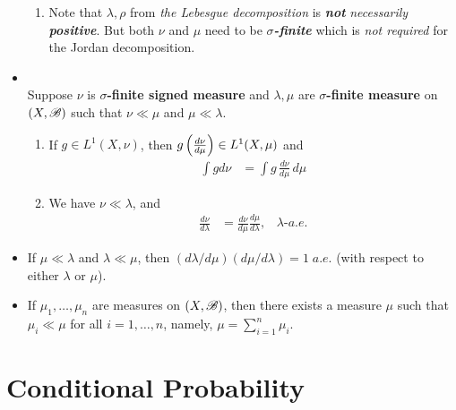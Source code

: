 \documentclass[11pt]{article}
\begin{document}
\begin{itemize}
\begin{remark}
\begin{enumerate}
\item Note that $\lambda, \rho$ from \emph{the Lebesgue decomposition} is \emph{\textbf{not}} \emph{necessarily} \emph{\textbf{positive}}. But both $\nu$ and $\mu$ need to be \emph{\textbf{$\sigma$-finite}} which is \emph{not required} for the Jordan decomposition.
\end{enumerate}
\end{remark} 

\item \begin{proposition}\citep{folland2013real}\\
 Suppose $\nu$ is \textbf{$\sigma$-finite signed measure} and $\lambda, \mu$ are \textbf{$\sigma$-finite measure} on $(X,{\mathscr B})$ such that $\nu\ll \mu$ and $\mu \ll \lambda$.
 \begin{enumerate}
 \item If $g\in L^{1}(X, \nu)$, then $g\left(\frac{d \nu}{d\mu}\right)\in L^{1}(X,\mu)$ and
 \begin{align*}
 \int g d\nu &= \int g \, \frac{d \nu}{d\mu}\, d\mu
 \end{align*}
 \item We have $\nu \ll \lambda$, and 
 \begin{align*}
 \frac{d\nu}{d\lambda} &= \frac{d\nu}{d\mu}\frac{d\mu}{d\lambda}, \;\;\; \lambda\text{-}a.e.
 \end{align*}
 \end{enumerate}
\end{proposition}

\item \begin{corollary}
If $\mu \ll \lambda$ and $\lambda \ll \mu$, then $(d\lambda / d\mu)(d\mu / d\lambda) = 1\; a.e$. (with respect to either $\lambda$ or $\mu$).
\end{corollary}
 
\item \begin{proposition} If $\mu_{1}, \ldots, \mu_{n}$ are measures on $(X,{\mathscr B})$, then there exists a measure $\mu$ such that $\mu_{i}\ll \mu$ for all $i=1,\ldots,n$, namely, $\mu= \sum_{i=1}^{n}\mu_{i}$.
\end{proposition}
\end{itemize}
\section{Conditional Probability}
\end{document}
